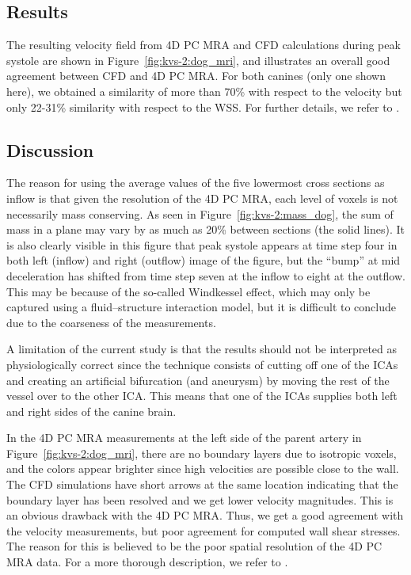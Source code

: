 \enlargethispage{10pt}

\vspace*{-10pt}

\subsection{Results}

The resulting velocity field from 4D PC MRA and CFD calculations
during peak systole are shown in Figure~\ref{fig:kvs-2:dog_mri}, and
illustrates an overall good agreement between CFD and 4D PC MRA. For
both canines (only one shown here), we obtained a similarity of more
than 70\% with respect to the velocity but only 22-31\% similarity
with respect to the WSS. For further details, we refer
to \citet{JiangJohnsonValen-SendstadEtAl2010}.

\subsection{Discussion}

The reason for using the average values of the five lowermost cross
sections as inflow is that given the resolution of the 4D PC MRA, each
level of voxels is not\vadjust{\pagebreak} necessarily mass conserving. As seen in
Figure~\ref{fig:kvs-2:mass_dog}, the sum of mass in a plane may vary
by as much as 20\% between sections (the solid lines).
It is also clearly visible in this figure that peak systole appears at
time step four in both left (inflow) and right (outflow) image of the
figure, but the ``bump'' at mid deceleration has shifted from time
step seven at the inflow to eight at the outflow.  This may be because
of the so-called Windkessel effect, which may only be captured using a
fluid--structure interaction model, but it is difficult to conclude due
to the coarseness of the measurements.

A limitation of the current study is that the results should not be
interpreted as physiologically correct since the technique consists of
cutting off one of the ICAs and creating an artificial bifurcation
(and aneurysm) by moving the rest of the vessel over to the other
ICA. This means that one of the ICAs supplies both left and right sides
of the canine brain.

In the 4D PC MRA measurements at the left side of the parent artery in
Figure~\ref{fig:kvs-2:dog_mri}, there are no boundary layers due to
isotropic voxels, and the colors appear brighter since high velocities
are possible close to the wall.  The CFD simulations have short arrows
at the same location indicating that the boundary layer has been
resolved and we get lower velocity magnitudes.  This is an obvious
drawback with the 4D PC MRA. Thus, we get a good agreement with the
velocity measurements, but poor agreement for computed wall shear
stresses. The reason for this is believed to be the poor spatial
resolution of the 4D PC MRA data. For a more thorough description, we
refer to \citet{JiangJohnsonValen-SendstadEtAl2010}.

